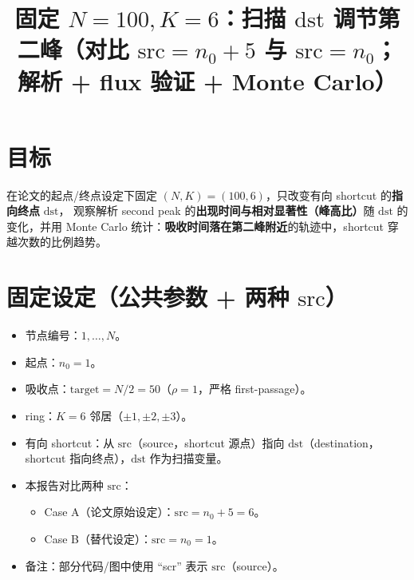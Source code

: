 \documentclass[11pt,fontset=fandol]{ctexart}
\title{固定 $N=100,K=6$：扫描 $\mathrm{dst}$ 调节第二峰（对比 $\mathrm{src}=n_0+5$ 与 $\mathrm{src}=n_0$；解析 + flux 验证 + Monte Carlo）}
\author{}
\date{}
\begin{document}
\sloppy
\maketitle

\section{目标}
在论文的起点/终点设定下固定 $(N,K)=(100,6)$，只改变有向 shortcut 的\textbf{指向终点} $\mathrm{dst}$，
观察解析 second peak 的\textbf{出现时间与相对显著性（峰高比）}随 $\mathrm{dst}$ 的变化，并用 Monte Carlo 统计：\textbf{吸收时间落在第二峰附近}的轨迹中，shortcut 穿越次数的比例趋势。

\section{固定设定（公共参数 + 两种 $\mathrm{src}$）}
\begin{itemize}
  \item 节点编号：$1,\dots,N$。
  \item 起点：$n_0=1$。
  \item 吸收点：$\mathrm{target}=N/2=50$（$\rho=1$，严格 first-passage）。
  \item ring：$K=6$ 邻居（$\pm1,\pm2,\pm3$）。
  \item 有向 shortcut：从 $\mathrm{src}$（source，shortcut 源点）指向 $\mathrm{dst}$（destination，shortcut 指向终点），$\mathrm{dst}$ 作为扫描变量。
  \item 本报告对比两种 $\mathrm{src}$：
  \begin{itemize}
    \item Case A（论文原始设定）：$\mathrm{src}=n_0+5=6$。
    \item Case B（替代设定）：$\mathrm{src}=n_0=1$。
  \end{itemize}
  \item 备注：部分代码/图中使用 ``scr'' 表示 $\mathrm{src}$（source）。
\end{itemize}

\newcommand{\CaseAFigDir}{figures/second_peak_dst_shortcut_usage/N100K6_n0_1_target_50_src_6/latest}
\newcommand{\CaseADataDir}{data/second_peak_dst_shortcut_usage/N100K6_n0_1_target_50_src_6/latest}
\newcommand{\CaseBFigDir}{figures/second_peak_dst_shortcut_usage/N100K6_n0_1_target_50_src_1/latest}
\newcommand{\CaseBDataDir}{data/second_peak_dst_shortcut_usage/N100K6_n0_1_target_50_src_1/latest}
\end{document}
